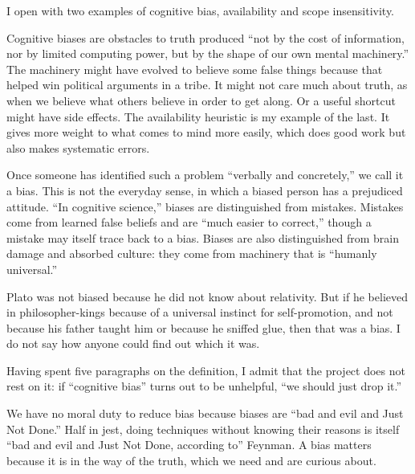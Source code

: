 
I open with two examples of cognitive bias, availability and scope insensitivity. 

Cognitive biases are obstacles to truth produced ``not by the cost of information, nor by limited computing power, but by the shape of our own mental machinery.'' The machinery might have evolved to believe some false things because that helped win political arguments in a tribe. It might not care much about truth, as when we believe what others believe in order to get along. Or a useful shortcut might have side effects. The availability heuristic is my example of the last. It gives more weight to what comes to mind more easily, which does good work but also makes systematic errors. 

Once someone has identified such a problem ``verbally and concretely,'' we call it a bias. This is not the everyday sense, in which a biased person has a prejudiced attitude. ``In cognitive science,'' biases are distinguished from mistakes. Mistakes come from learned false beliefs and are ``much easier to correct,'' though a mistake may itself trace back to a bias.  Biases are also distinguished from brain damage and absorbed culture: they come from machinery that is ``humanly universal.''

Plato was not biased because he did not know about relativity. But if he believed in philosopher-kings because of a universal instinct for self-promotion, and not because his father taught him or because he sniffed glue, then that was a bias. I do not say how anyone could find out which it was.

Having spent five paragraphs on the definition, I admit that the project does not rest on it: if ``cognitive bias'' turns out to be unhelpful, ``we should just drop it.''

We have no moral duty to reduce bias because biases are ``bad and evil and Just Not Done.'' Half in jest, doing techniques without knowing their reasons is itself ``bad and evil and Just Not Done, according to'' Feynman. A bias matters because it is in the way of the truth, which we need and are curious about.
